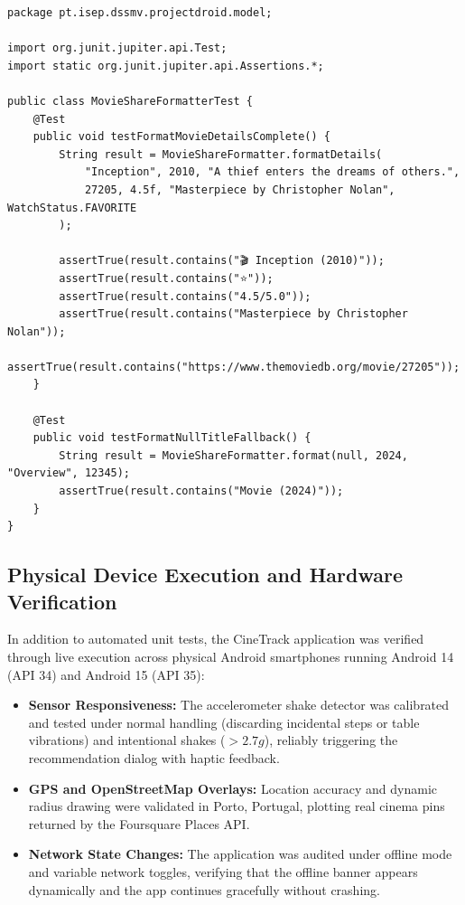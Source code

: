 \documentclass[runningheads,a4paper]{llncs}
\begin{document}
\clearpage
\begin{lstlisting}[style=javastyle,caption={JUnit 5 Social Share Formatter Tests (MovieShareFormatterTest.java)},label={lst:share-test}]
package pt.isep.dssmv.projectdroid.model;

import org.junit.jupiter.api.Test;
import static org.junit.jupiter.api.Assertions.*;

public class MovieShareFormatterTest {
    @Test
    public void testFormatMovieDetailsComplete() {
        String result = MovieShareFormatter.formatDetails(
            "Inception", 2010, "A thief enters the dreams of others.",
            27205, 4.5f, "Masterpiece by Christopher Nolan", WatchStatus.FAVORITE
        );

        assertTrue(result.contains("🎬 Inception (2010)"));
        assertTrue(result.contains("⭐"));
        assertTrue(result.contains("4.5/5.0"));
        assertTrue(result.contains("Masterpiece by Christopher Nolan"));
        assertTrue(result.contains("https://www.themoviedb.org/movie/27205"));
    }

    @Test
    public void testFormatNullTitleFallback() {
        String result = MovieShareFormatter.format(null, 2024, "Overview", 12345);
        assertTrue(result.contains("Movie (2024)"));
    }
}
\end{lstlisting}

\subsection{Physical Device Execution and Hardware Verification}
In addition to automated unit tests, the CineTrack application was verified through live execution across physical Android smartphones running Android 14 (API 34) and Android 15 (API 35):
\begin{itemize}
    \item \textbf{Sensor Responsiveness:} The accelerometer shake detector was calibrated and tested under normal handling (discarding incidental steps or table vibrations) and intentional shakes ($>2.7g$), reliably triggering the recommendation dialog with haptic feedback.
    \item \textbf{GPS and OpenStreetMap Overlays:} Location accuracy and dynamic radius drawing were validated in Porto, Portugal, plotting real cinema pins returned by the Foursquare Places API.
    \item \textbf{Network State Changes:} The application was audited under offline mode and variable network toggles, verifying that the offline banner appears dynamically and the app continues gracefully without crashing.
\end{itemize}
\end{document}
